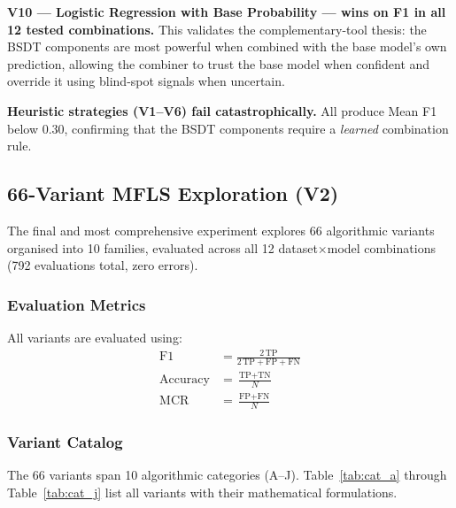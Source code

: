 \documentclass[journal]{IEEEtran}
\begin{document}
\textbf{V10 --- Logistic Regression with Base Probability --- wins on F1 in all 12 tested combinations.} This validates the complementary-tool thesis: the BSDT components are most powerful when combined with the base model's own prediction, allowing the combiner to trust the base model when confident and override it using blind-spot signals when uncertain.

\textbf{Heuristic strategies (V1--V6) fail catastrophically.} All produce Mean F1 below 0.30, confirming that the BSDT components require a \textit{learned} combination rule.

\subsection{66-Variant MFLS Exploration (V2)}
\label{ssec:v2}

The final and most comprehensive experiment explores 66 algorithmic variants organised into 10 families, evaluated across all 12 dataset$\times$model combinations (792 evaluations total, zero errors).

\subsubsection{Evaluation Metrics}

All variants are evaluated using:
\begin{align}
  \text{F1}     &= \frac{2\,\text{TP}}{2\,\text{TP} + \text{FP} + \text{FN}} \label{eq:f1} \\
  \text{Accuracy} &= \frac{\text{TP} + \text{TN}}{N} \label{eq:acc} \\
  \text{MCR}    &= \frac{\text{FP} + \text{FN}}{N} \label{eq:mcr}
\end{align}

\subsubsection{Variant Catalog}

The 66 variants span 10 algorithmic categories (A--J). Table~\ref{tab:cat_a} through Table~\ref{tab:cat_j} list all variants with their mathematical formulations.
\end{document}

